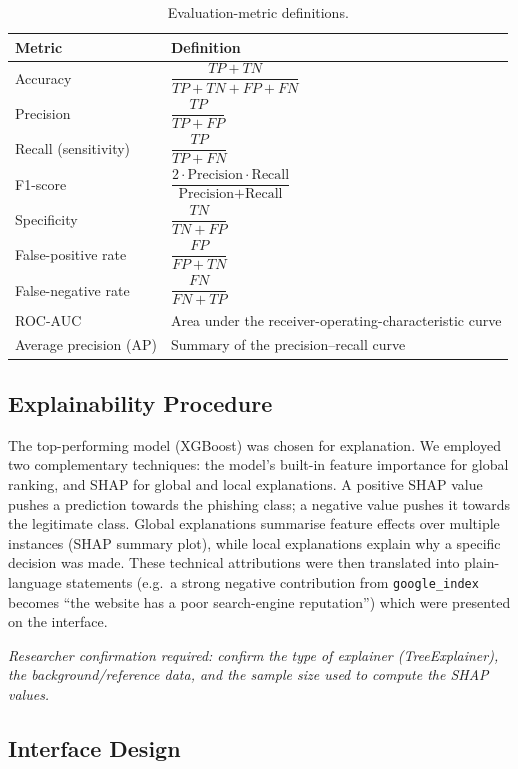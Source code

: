 \documentclass[11pt,a4paper]{article}
\renewcommand{\arraystretch}{1.25}
\begin{document}
\begin{table}[H]
\caption{Evaluation-metric definitions.}
\label{tab:metrics}
\centering\footnotesize
\renewcommand{\arraystretch}{1.8}
\begin{tabularx}{\textwidth}{p{4.2cm} L}
\toprule
\textbf{Metric} & \textbf{Definition} \\
\midrule
Accuracy & $\dfrac{TP+TN}{TP+TN+FP+FN}$ \\
Precision & $\dfrac{TP}{TP+FP}$ \\
Recall (sensitivity) & $\dfrac{TP}{TP+FN}$ \\
F1-score & $\dfrac{2\cdot\text{Precision}\cdot\text{Recall}}{\text{Precision}+\text{Recall}}$ \\
Specificity & $\dfrac{TN}{TN+FP}$ \\
False-positive rate & $\dfrac{FP}{FP+TN}$ \\
False-negative rate & $\dfrac{FN}{FN+TP}$ \\
ROC-AUC & Area under the receiver-operating-characteristic curve \\
Average precision (AP) & Summary of the precision--recall curve \\
\bottomrule
\end{tabularx}
\end{table}

\subsection{Explainability Procedure}

The top-performing model (XGBoost) was chosen for explanation. We employed two complementary
techniques: the model's built-in feature importance for global ranking, and SHAP for global
and local explanations. A positive SHAP value pushes a prediction towards the phishing class;
a negative value pushes it towards the legitimate class. Global explanations summarise feature
effects over multiple instances (SHAP summary plot), while local explanations explain why a
specific decision was made. These technical attributions were then translated into
plain-language statements (e.g.\ a strong negative contribution from \texttt{google\_index}
becomes ``the website has a poor search-engine reputation'') which were presented on the
interface.

\textit{Researcher confirmation required: confirm the type of explainer (TreeExplainer), the
background/reference data, and the sample size used to compute the SHAP values.}

\subsection{Interface Design}
\end{document}
